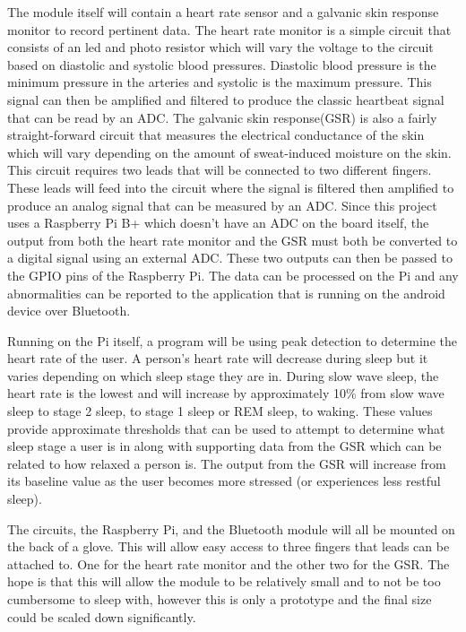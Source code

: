 \documentclass[finalProposal.tex]{subfiles}
\begin{document}
\onehalfspacing


\bigskip

The module itself will contain a heart rate sensor and a galvanic skin response monitor to record pertinent data. The heart rate monitor is a simple circuit that consists of an led and photo resistor
which will vary the voltage to the circuit based on diastolic and systolic blood pressures. Diastolic blood pressure is the minimum pressure in the arteries and systolic is the maximum pressure. This
signal can then be amplified and filtered to produce the classic heartbeat signal that can be read by an ADC. The galvanic skin response(GSR) is also a fairly straight-forward circuit that measures
the electrical conductance of the skin which will vary depending on the amount of sweat-induced moisture on the skin. This circuit requires two leads that will be connected to two different fingers.
These leads will feed into the circuit where the signal is filtered then amplified to produce an analog signal that can be measured by an ADC. Since this project uses a Raspberry Pi B+ which doesn't have
an ADC on the board itself, the output from both the heart rate monitor and the GSR must both be converted to a digital signal using an external ADC. These two outputs can then be passed to the GPIO
pins of the Raspberry Pi. The data can be processed on the Pi and any abnormalities can be reported to the application that is running on the android device over Bluetooth.  

Running on the Pi itself, a program will be using peak detection to determine the heart rate of the user. A person's heart rate will decrease during sleep but it varies depending on which sleep stage
they are in. During slow wave sleep, the heart rate is the lowest and will increase by approximately 10\% from slow wave sleep to stage 2 sleep, to stage 1 sleep or REM sleep, to waking. These values
provide approximate thresholds that can be used to attempt to determine what sleep stage a user is in along with supporting data from the GSR which can be related to how relaxed a person is. The output
from the GSR will increase from its baseline value as the user becomes more stressed (or experiences less restful sleep).

The circuits, the Raspberry Pi, and the Bluetooth module will all be mounted on the back of a glove. This will allow easy access to three fingers that leads can be attached to. One for the heart rate
monitor and the other two for the GSR. The hope is that this will allow the module to be relatively small and to not be too cumbersome to sleep with, however this is only a prototype and the final
size could be scaled down significantly.
\end{document}
